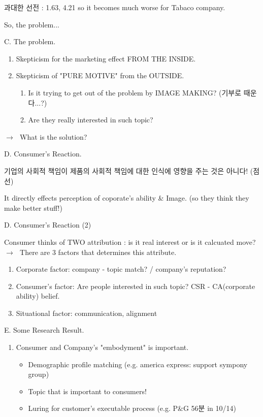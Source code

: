 \documentclass[12pt]{article}
\newcommand{\ra}{$\rightarrow \text{ }$}
\begin{document}
\begin{itemize}
과대한 선전 : 1.63, 4.21 so it becomes much worse for Tabaco company.


So, the problem...

C. The problem.

\begin{enumerate}
	\item Skepticism for the marketing effect FROM THE INSIDE.
	\item Skepticism of "PURE MOTIVE" from the OUTSIDE.
	\begin{enumerate}
		\item Is it trying to get out of the problem by IMAGE MAKING? (기부로 때운다...?)
		\item Are they really interested in such topic?

	\end{enumerate}
\end{enumerate}

\ra What is the solution?


D. Consumer's Reaction.

기업의 사회적 책임이 제품의 사회적 책임에 대한 인식에 영향을 주는 것은 아니다! (점선)

It directly effects perception of coporate's ability \& Image. (so they think they make better stuff!)



D. Consumer's Reaction (2)

Consumer thinks of TWO attribution : is it real interest or is it calcuated move? \ra There are 3 factors that determines this attribute.

\begin{enumerate}
	\item Corporate factor: company - topic match? / company's reputation?
	\item Consumer's factor: Are people interested in such topic? CSR - CA(corporate ability) belief.
	\item Situational factor: communication, alignment
\end{enumerate}

E. Some Research Result.

\begin{enumerate}
	\item Consumer and Company's "embodyment" is important.
	\begin{itemize}
		\item Demographic profile matching (e.g. america express: support sympony group)
		\item Topic that is important to consumers!
		\item Luring for customer's executable process (e.g. P&G 56분 in 10/14)
	\end{itemize}


\end{enumerate}
\end{itemize}
\end{document}
